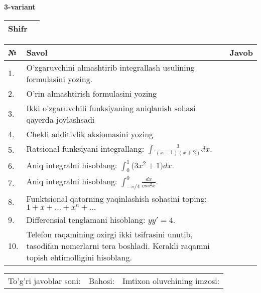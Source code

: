 \documentclass{article}
\begin{document}
  \egroup
  
  \newpage
  
  
  \textbf{3-variant}\\
  
  \bgroup
  \def\arraystretch{1.6} %
  
  \begin{tabular}{|m{5.7cm}|m{9.5cm}|}
  \hline
  Shifr & \\
  \hline
  \end{tabular}
  
  \vspace{1cm}
  
  \begin{tabular}{|m{0.7cm}|m{10cm}|m{4cm}|}
  \hline
  № & Savol & Javob \\
  \hline
  1. & O'zgaruvchini almashtirib integrallash usulining formulasini yozing. &  \\
  \hline
  2. & O'rin almashtirish formulasini yozing &  \\
  \hline
  3. & Ikki o'zgaruvchili funksiyaning aniqlanish sohasi qayerda joylashsadi &  \\
  \hline
  4. & Chekli additivlik aksiomasini yozing &  \\
  \hline
  5. & Ratsional funksiyani integrallang: \(\int {\frac{3}{(x - 1)(x + 2)}dx}\). &  \\
  \hline
  6. & Aniq integralni hisoblang: \(\int_{0}^{1}{(3x^{2}} + 1)dx\). &  \\
  \hline
  7. & Aniq integralni hisoblang: \(\int_{- \pi/4}^{0}\frac{dx}{cos^{2}x}\). &  \\
  \hline
  8. & Funktsional qatorning yaqinlashish sohasini toping:\(1 + x + ... + x^{n} + ...\) &  \\
  \hline
  9. & Differensial tenglamani hisoblang: \(yy' = 4\). &  \\
  \hline
  10. & Telefon raqamining oxirgi ikki tsifrasini unutib, tasodifan nomerlarni tera boshladi. Kerakli raqamni topish ehtimolligini hisoblang. &  \\
  \hline
  \end{tabular}
  
  \vspace{1cm}
  
  \begin{tabular}{lll}
  To'g'ri javoblar soni: \underline{\hspace{1.5cm}} & 
  Bahosi: \underline{\hspace{1.5cm}} & 
  Imtixon oluvchining imzosi: \underline{\hspace{2cm}} \\
  \end{tabular}
  
\end{document}
